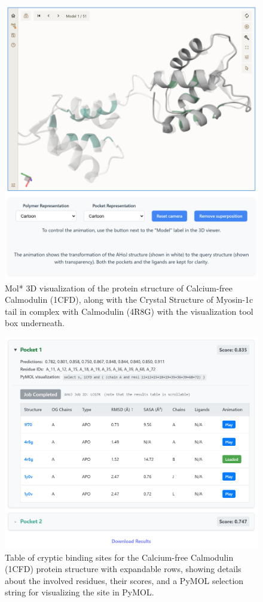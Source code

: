 \begin{figure}[htbp]
    \centering
    \includegraphics[width=\textwidth]{img/ui-molstar.png}
    \caption{Mol* 3D visualization of the protein structure of Calcium-free Calmodulin (1CFD), along with the Crystal Structure of Myosin-1c tail in complex with Calmodulin (4R8G) with the visualization tool box underneath.}
    \label{fig:ui-molstar}
\end{figure}

\begin{figure}[htbp]
    \centering
    \includegraphics[width=\textwidth]{img/ui-table.png}
    \caption{Table of cryptic binding sites for the Calcium-free Calmodulin (1CFD) protein structure with expandable rows, showing details about the involved residues, their scores, and a PyMOL selection string for visualizing the site in PyMOL.}
    \label{fig:ui-table}
\end{figure}

